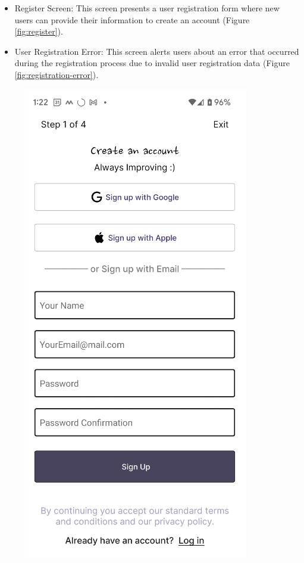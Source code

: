 \begin{itemize}
\item Register Screen: This screen presents a user registration form where new users can provide their information to create an account (Figure \ref{fig:register}).
\item User Registration Error: This screen alerts users about an error that occurred during the registration process due to invalid user registration data (Figure \ref{fig:registration-error}).
\end{itemize}

\begin{figure}[htbp]
    \centering
    \begin{minipage}[t]{0.35\textwidth}
        \centering
        \includegraphics[width=\textwidth]{Screen Shots/Moneager/RegisterScreen.png}

\end{minipage}
\end{figure}
